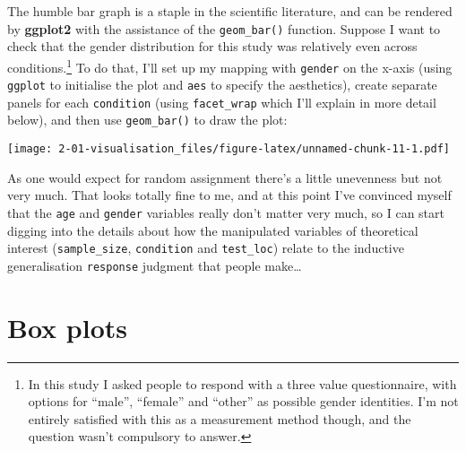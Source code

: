\documentclass[]{book}
\newenvironment{Shaded}{\begin{snugshade}}{\end{snugshade}}
\newcommand{\CommentTok}[1]{\textcolor[rgb]{0.56,0.35,0.01}{\textit{#1}}}
\newcommand{\DataTypeTok}[1]{\textcolor[rgb]{0.13,0.29,0.53}{#1}}
\newcommand{\KeywordTok}[1]{\textcolor[rgb]{0.13,0.29,0.53}{\textbf{#1}}}
\newcommand{\NormalTok}[1]{#1}
\newcommand{\OperatorTok}[1]{\textcolor[rgb]{0.81,0.36,0.00}{\textbf{#1}}}
\newcommand{\StringTok}[1]{\textcolor[rgb]{0.31,0.60,0.02}{#1}}
\let\rmarkdownfootnote\footnote%
\def\footnote{\protect\rmarkdownfootnote}
\begin{document}
The humble bar graph is a staple in the scientific literature, and can be rendered by \textbf{ggplot2} with the assistance of the \texttt{geom\_bar()} function. Suppose I want to check that the gender distribution for this study was relatively even across conditions.\footnote{In this study I asked people to respond with a three value questionnaire, with options for ``male'', ``female'' and ``other'' as possible gender identities. I'm not entirely satisfied with this as a measurement method though, and the question wasn't compulsory to answer.} To do that, I'll set up my mapping with \texttt{gender} on the x-axis (using \texttt{ggplot} to initialise the plot and \texttt{aes} to specify the aesthetics), create separate panels for each \texttt{condition} (using \texttt{facet\_wrap} which I'll explain in more detail below), and then use \texttt{geom\_bar()} to draw the plot:

\begin{Shaded}
\end{Shaded}

\texttt{[image: 2-01-visualisation\_files/figure-latex/unnamed-chunk-11-1.pdf]}

As one would expect for random assignment there's a little unevenness but not very much. That looks totally fine to me, and at this point I've convinced myself that the \texttt{age} and \texttt{gender} variables really don't matter very much, so I can start digging into the details about how the manipulated variables of theoretical interest (\texttt{sample\_size}, \texttt{condition} and \texttt{test\_loc}) relate to the inductive generalisation \texttt{response} judgment that people make\ldots{}

\hypertarget{box-plots}{%
\section{Box plots}\label{box-plots}}
\end{document}
